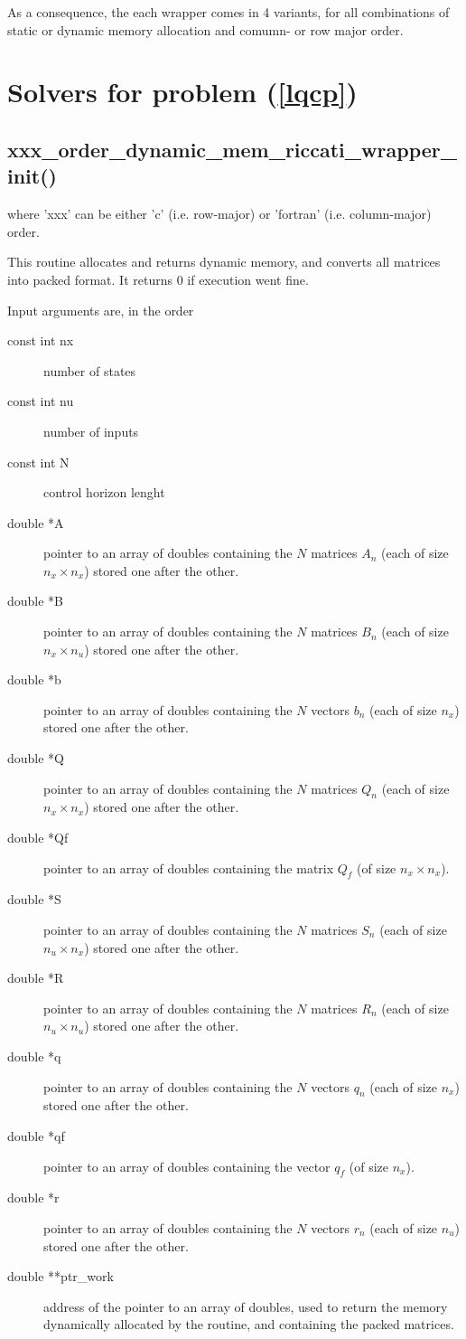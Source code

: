 \documentclass[a4paper]{report}
\begin{document}
As a consequence, the each wrapper comes in 4 variants, for all combinations of static or dynamic memory allocation and comumn- or row major order.

\section{Solvers for problem (\ref{lqcp})}

\subsection{xxx\_order\_dynamic\_mem\_riccati\_wrapper\_init() } 
where 'xxx' can be either 'c' (i.e. row-major) or 'fortran' (i.e. column-major) order.

This routine allocates and returns dynamic memory, and converts all matrices into packed format.
It returns 0 if execution went fine.

Input arguments are, in the order
\begin{description}
\item[const int nx] number of states
\item[const int nu] number of inputs
\item[const int N] control horizon lenght
\item[double *A] pointer to an array of doubles containing the $N$ matrices $A_n$ (each of size $n_x\times n_x$) stored one after the other.
\item[double *B] pointer to an array of doubles containing the $N$ matrices $B_n$ (each of size $n_x\times n_u$) stored one after the other.
\item[double *b] pointer to an array of doubles containing the $N$ vectors $b_n$ (each of size $n_x$) stored one after the other.
\item[double *Q] pointer to an array of doubles containing the $N$ matrices $Q_n$ (each of size $n_x\times n_x$) stored one after the other.
\item[double *Qf] pointer to an array of doubles containing the matrix $Q_f$ (of size $n_x\times n_x$).
\item[double *S] pointer to an array of doubles containing the $N$ matrices $S_n$ (each of size $n_u\times n_x$) stored one after the other.
\item[double *R] pointer to an array of doubles containing the $N$ matrices $R_n$ (each of size $n_u\times n_u$) stored one after the other.
\item[double *q] pointer to an array of doubles containing the $N$ vectors $q_n$ (each of size $n_x$) stored one after the other.
\item[double *qf] pointer to an array of doubles containing the vector $q_f$ (of size $n_x$).
\item[double *r] pointer to an array of doubles containing the $N$ vectors $r_n$ (each of size $n_u$) stored one after the other.
\item[double **ptr\_work] address of the pointer to an array of doubles, used to return the memory dynamically allocated by the routine, and containing the packed matrices.
\end{description}
\end{document}
